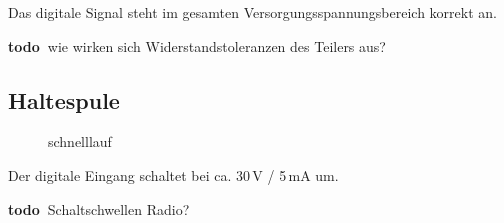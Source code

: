 \documentclass[ngerman,11pt,parskip=half] {scrartcl}
\newcommand {\todo} {\textbf{\color{red} todo\ }}
\newcommand {\tscopesize}{12cm}
\begin{document}
Das digitale Signal steht im gesamten Versorgungsspannungsbereich korrekt an. 

\todo wie wirken sich Widerstandstoleranzen des Teilers aus?

\subsection{Haltespule} \label{sec:inbetriebnahme:hs}

\begin{figure}[H]
\centering
{}
\caption{schnelllauf} \label{fig:1}
\end{figure}

Der digitale Eingang schaltet bei ca. 30\,V / 5\,mA um.

\todo Schaltschwellen Radio?
\end{document}
